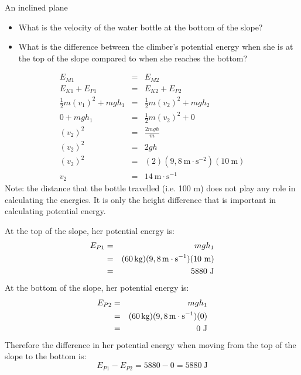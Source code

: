 \begin{wex}{An inclined plane}
{
\begin{itemize}
\item What is the velocity of the water bottle at the bottom of the slope?
\item What is the difference between the climber's potential energy when she is at the top of the slope compared to when she reaches the bottom?
\end{itemize}

\begin{eqnarray*}
E_{M1} &=& E_{M2} \\
E_{K1} + E_{P1} &=& E_{K2} + E_{P2} \\
\frac{1}{2}m(v_{1})^2 + mgh_{1} &=& \frac{1}{2}m(v_{2})^2 + mgh_{2}\\
0 + mgh_{1} &=& \frac{1}{2}m(v_{2})^2 + 0 \\
(v_{2})^2 &=& \frac{2mgh}{m} \\
(v_{2})^2 &=& 2gh \\
(v_{2})^2 &=& (2)(9,8~\text{m}\cdot \text{s}^{-2})(10~\text{m}) \\
v_2 &=& 14 \ \text{m} \cdot \text{s}^{-1}
\end{eqnarray*}
Note: the distance that the bottle travelled (i.e. 100 m) does not play any role in calculating the energies. It is only the height difference that is important in calculating potential energy.

At the top of the slope, her potential energy is:
\begin{eqnarray*}
E_{P1} &=& mgh_1 \\
&=& (60\,\text{kg})(9,8\,\text{m} \cdot \text{s}^{-1})(10~\text{m}) \\
&=& 5880 \ \text{J}
\end{eqnarray*}
At the bottom of the slope, her potential energy is:
\begin{eqnarray*}
E_{P2} &=& mgh_1 \\
&=& (60\,\text{kg})(9,8\,\text{m} \cdot \text{s}^{-1})(0) \\
&=& 0 \ \text{J}
\end{eqnarray*}
Therefore the difference in her potential energy when moving from the top of the slope to the bottom is:
\begin{equation*}
E_{P1} - E_{P2} = 5880 - 0 = 5880 \ \text{J}
\end{equation*}
}
\end{wex}





